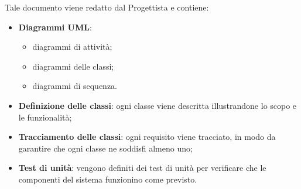 	     Tale documento viene redatto dal Progettista e contiene:
	     \begin{itemize}
	     	\item \textbf{Diagrammi UML}:
				\begin{itemize}
					\item{diagrammi di attività;}
    				\item{diagrammi delle classi;}
					\item{diagrammi di sequenza.}
				\end{itemize}
			\item \textbf{Definizione delle classi}: ogni classe viene descritta illustrandone lo scopo e le funzionalità;
			\item \textbf{Tracciamento delle classi}: ogni requisito viene tracciato, in modo da garantire che ogni classe ne soddisfi almeno uno; 
			\item \textbf{Test di unità}: vengono definiti dei test di unità per verificare che le componenti del sistema funzionino come previsto. 
	     \end{itemize}
     
